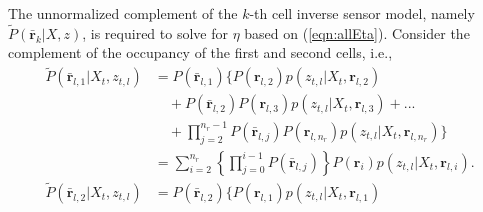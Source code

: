 \documentclass[letterpaper, 10pt, conference]{ieeeconf}
\newcommand{\refeqn}[1]{(\ref{eqn:#1})}
\begin{document}
\begin{appendix}
The unnormalized complement of the $k$-th cell inverse sensor model, namely $\tilde P(\bar{\mathbf{r}}_k|X,z)$, is required to solve for $\eta$ based on \refeqn{allEta}.
Consider the complement of the occupancy of the first and second cells, i.e.,
\begin{align}
\label{eqn:InvSenModknot1}
\tilde P(\bar{\mathbf{r}}_{l,1}|X_t,z_{t,l})
&=P(\bar{\mathbf{r}}_{l,1})
\bigg\{P(\mathbf{r}_{l,2})
p(z_{t,l}|X_t,\mathbf{r}_{l,2})\nonumber\\&\quad
+P(\bar{\mathbf{r}}_{l,2})P(\mathbf{r}_{l,3})p(z_{t,l}|X_t,\mathbf{r}_{l,3})+...\nonumber\\&\quad+\prod_{j=2}^{n_r-1}P(\bar{\mathbf{r}}_{l,j})P(\mathbf{r}_{l,n_r})p(z_{t,l}|X_t,\mathbf{r}_{l,n_r})
\bigg\}\nonumber
\\
&=\sum_{i=2}^{n_r}
\left\{\prod_{j=0}^{i-1}P(\bar{\mathbf{r}}_{l,j})
\right\}P(\mathbf{r}_{i})p(z_{t,l}|X_t,\mathbf{r}_{l,i}).
\\
\label{eqn:InvSenModknot2}
\tilde P(\bar{\mathbf{r}}_{l,2}|X_t,z_{t,l})
&=P(\bar{\mathbf{r}}_{l,2})
\bigg\{
P(\mathbf{r}_{l,1})p(z_{t,l}|X_t,\mathbf{r}_{l,1})\nonumber\\&\quad

\end{align}
\end{appendix}
\end{document}
